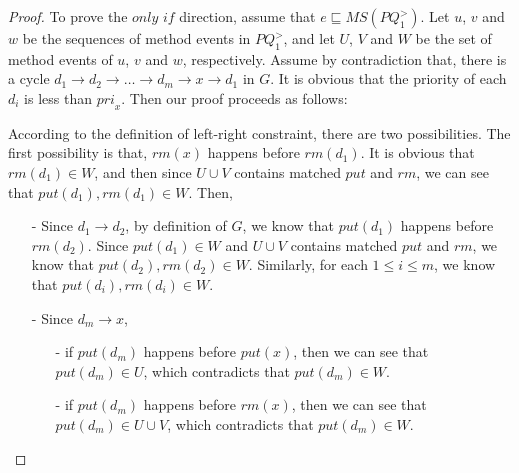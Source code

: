 \begin {proof}

To prove the $\textit{only if}$ direction, assume that $e \sqsubseteq \textit{MS}(\textit{PQ}_1^{>})$. Let $u$, $v$ and $w$ be the sequences of method events in $\textit{PQ}_1^{>}$, and let $U$, $V$ and $W$ be the set of method events of $u$, $v$ and $w$, respectively. Assume by contradiction that, there is a cycle $d_1 \rightarrow d_2 \rightarrow \ldots \rightarrow d_m \rightarrow x \rightarrow d_1$ in $G$. It is obvious that the priority of each $d_i$ is less than $\textit{pri}_x$. Then our proof proceeds as follows:

According to the definition of left-right constraint, there are two possibilities. The first possibility is that, $\textit{rm}(x)$ happens before $\textit{rm}(d_1)$. It is obvious that $\textit{rm}(d_1) \in W$, and then since $U \cup V$ contains matched $\textit{put}$ and $\textit{rm}$, we can see that $\textit{put}(d_1),\textit{rm}(d_1) \in W$. Then,

\begin{itemize}
\setlength{\itemsep}{0.5pt}
\item[-] Since $d_1 \rightarrow d_2$, by definition of $G$, we know that $\textit{put}(d_1)$ happens before $\textit{rm}(d_2)$. Since $\textit{put}(d_1) \in W$ and $U \cup V$ contains matched $\textit{put}$ and $\textit{rm}$, we know that $\textit{put}(d_2),\textit{rm}(d_2) \in W$. Similarly, for each $1 \leq i \leq m$, we know that $\textit{put}(d_i),\textit{rm}(d_i) \in W$.

\item[-] Since $d_m \rightarrow x$,
    \begin{itemize}
    \setlength{\itemsep}{0.5pt}
    \item[-] if $\textit{put}(d_m)$ happens before $\textit{put}(x)$, then we can see that $\textit{put}(d_m) \in U$, which contradicts that $\textit{put}(d_m) \in W$.

    \item[-] if $\textit{put}(d_m)$ happens before $\textit{rm}(x)$, then we can see that $\textit{put}(d_m) \in U \cup V$, which contradicts that $\textit{put}(d_m) \in W$.
    \end{itemize}
\end{itemize}


\end{proof}
